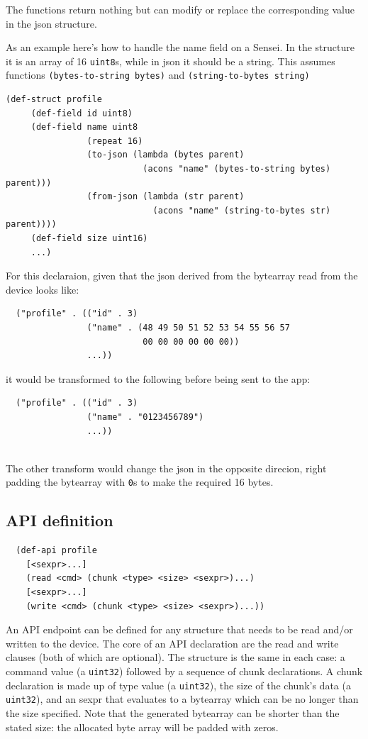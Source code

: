 \documentclass[12pt]{article}
\begin{document}
The functions return nothing but can modify or replace the
corresponding value in the json structure.

As an example here's how to handle the name field on a Sensei. In the
structure it is an array of 16 \verb|uint8|s, while in json it should
be a string. This assumes functions \verb|(bytes-to-string bytes)| and
\verb|(string-to-bytes string)|

\begin{verbatim} 
(def-struct profile
     (def-field id uint8)
     (def-field name uint8 
                (repeat 16)
                (to-json (lambda (bytes parent)
                           (acons "name" (bytes-to-string bytes) parent)))
                (from-json (lambda (str parent)
                             (acons "name" (string-to-bytes str) parent))))
     (def-field size uint16)
     ...)
\end{verbatim}

\noindent For this declaraion, given that the json derived from the
bytearray read from the device looks like:

\begin{verbatim}
  ("profile" . (("id" . 3)
                ("name" . (48 49 50 51 52 53 54 55 56 57 
                           00 00 00 00 00 00))
                ...))
\end{verbatim}

\noindent it would be transformed to the following before being sent
to the app:

\begin{verbatim}
  ("profile" . (("id" . 3)
                ("name" . "0123456789")
                ...))
 
\end{verbatim}

\noindent The other transform would change the json in the opposite
direcion, right padding the bytearray with \verb|0|s to make the
required 16 bytes.

\subsection{API definition}

\begin{verbatim}
  (def-api profile
    [<sexpr>...]
    (read <cmd> (chunk <type> <size> <sexpr>)...)
    [<sexpr>...]
    (write <cmd> (chunk <type> <size> <sexpr>)...))
\end{verbatim}

\noindent An API endpoint can be defined for any structure that needs
to be read and/or written to the device. The core of an API
declaration are the read and write clauses (both of which are
optional). The structure is the same in each case: a command value
(a \verb|uint32|) followed by a sequence of chunk declarations. A chunk
declaration is made up of type value (a \verb|uint32|), the size of the chunk's
data (a \verb|uint32|), and an sexpr that evaluates to a bytearray which can be
no longer than the size specified. Note that the generated bytearray
can be shorter than the stated size: the allocated byte array will be
padded with zeros.
\end{document}
